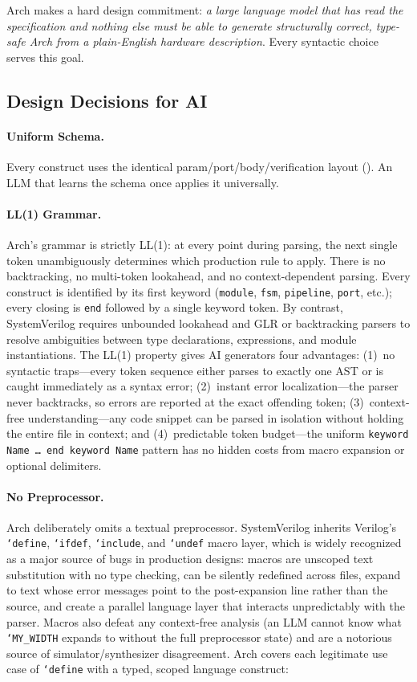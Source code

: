 \documentclass[manuscript]{acmart}
\begin{document}
Arch makes a hard design commitment: \emph{a large language model that has read the specification and nothing else must be able to generate structurally correct, type-safe Arch from a plain-English hardware description}. Every syntactic choice serves this goal.

\subsection{Design Decisions for AI}

\paragraph{Uniform Schema.} Every construct uses the identical param/port/body/verification layout (). An LLM that learns the schema once applies it universally.

\paragraph{LL(1) Grammar.} Arch's grammar is strictly LL(1): at every point during parsing, the next single token unambiguously determines which production rule to apply. There is no backtracking, no multi-token lookahead, and no context-dependent parsing. Every construct is identified by its first keyword (\texttt{module}, \texttt{fsm}, \texttt{pipeline}, \texttt{port}, etc.); every closing is \texttt{end} followed by a single keyword token. By contrast, SystemVerilog requires unbounded lookahead and GLR or backtracking parsers to resolve ambiguities between type declarations, expressions, and module instantiations. The LL(1) property gives AI generators four advantages: (1)~no syntactic traps---every token sequence either parses to exactly one AST or is caught immediately as a syntax error; (2)~instant error localization---the parser never backtracks, so errors are reported at the exact offending token; (3)~context-free understanding---any code snippet can be parsed in isolation without holding the entire file in context; and (4)~predictable token budget---the uniform \texttt{keyword Name \ldots\ end keyword Name} pattern has no hidden costs from macro expansion or optional delimiters.

\paragraph{No Preprocessor.} Arch deliberately omits a textual preprocessor. SystemVerilog inherits Verilog's \texttt{`define}, \texttt{`ifdef}, \texttt{`include}, and \texttt{`undef} macro layer, which is widely recognized as a major source of bugs in production designs: macros are unscoped text substitution with no type checking, can be silently redefined across files, expand to text whose error messages point to the post-expansion line rather than the source, and create a parallel language layer that interacts unpredictably with the parser. Macros also defeat any context-free analysis (an LLM cannot know what \texttt{`MY\_WIDTH} expands to without the full preprocessor state) and are a notorious source of simulator/synthesizer disagreement. Arch covers each legitimate use case of \texttt{`define} with a typed, scoped language construct:
\end{document}
